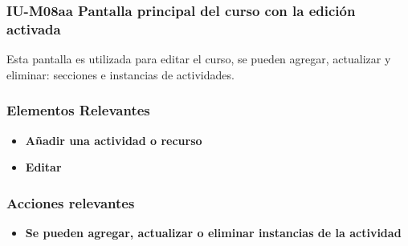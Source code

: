 
\subsubsection{IU-M08aa Pantalla principal del curso con la edición activada}

 Esta pantalla es utilizada para editar el curso, se pueden agregar, actualizar y eliminar: secciones e instancias de actividades.


\subsubsection{Elementos Relevantes}

    \begin{itemize}
    \item {\bf Añadir una actividad o recurso}
    \item {\bf Editar}
    \end{itemize}

\subsubsection{Acciones relevantes}

    \begin{itemize}
    \item {\bf Se pueden agregar, actualizar o eliminar instancias de la actividad}

    \end{itemize}

\clearpage
